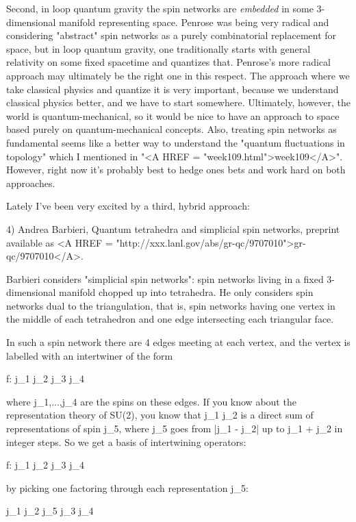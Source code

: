 Second, in loop quantum gravity the spin networks are \emph{embedded} in some
3-dimensional manifold representing space.  Penrose was being very
radical and considering "abstract" spin networks as a purely
combinatorial replacement for space, but in loop quantum gravity, one
traditionally starts with general relativity on some fixed spacetime and
quantizes that.  Penrose's more radical approach may ultimately be the
right one in this respect.  The approach where we take classical physics
and quantize it is very important, because we understand classical
physics better, and we have to start somewhere.  Ultimately, however,
the world is quantum-mechanical, so it would be nice to have an approach
to space based purely on quantum-mechanical concepts.  Also, treating
spin networks as fundamental seems like a better way to understand the
"quantum fluctuations in topology" which I mentioned in "<A HREF = "week109.html">week109</A>".
However, right now it's probably best to hedge ones bets and work hard
on both approaches.

Lately I've been very excited by a third, hybrid approach:

4) Andrea Barbieri, Quantum tetrahedra and simplicial spin networks, 
preprint available as <A HREF = "http://xxx.lanl.gov/abs/gr-qc/9707010">gr-qc/9707010</A>.  

Barbieri considers "simplicial spin networks": spin networks living in a
fixed 3-dimensional manifold chopped up into tetrahedra.  He only
considers spin networks dual to the triangulation, that is, spin
networks having one vertex in the middle of each tetrahedron and one
edge intersecting each triangular face.

In such a spin network there are 4 edges meeting at each vertex,
and the vertex is labelled with an intertwiner of the form

               f: j_{1} \otimes  j_{2} \to  j_{3} \otimes  j_{4}

where j_{1},...,j_{4} are the spins on these edges.  If you know about the
representation theory of SU(2), you know that j_{1} \otimes  j_{2} is a direct
sum of representations of spin j_{5}, where j_{5} goes from |j_{1} - j_{2}| up to 
j_{1} + j_{2} in integer steps.  So we get a basis of intertwining operators:

               f: j_{1} \otimes  j_{2} \to  j_{3} \otimes  j_{4}

by picking one factoring through each representation j_{5}:

             j_{1} \otimes  j_{2} \to  j_{5} \to  j_{3} \otimes  j_{4}

